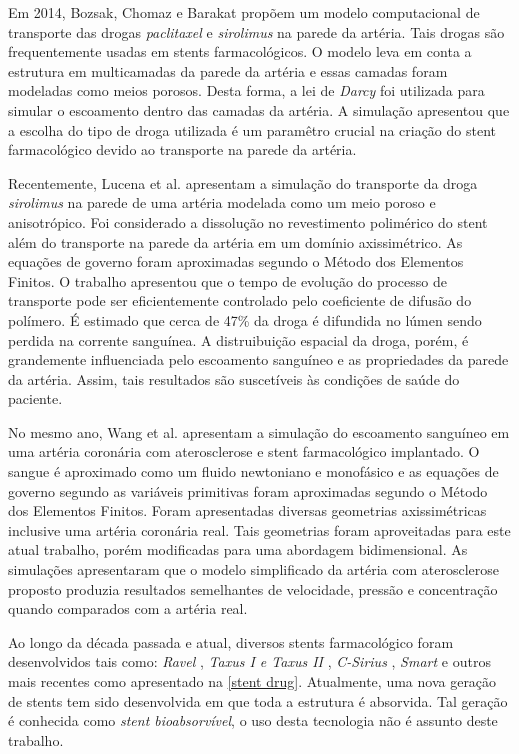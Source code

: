 \medskip
Em 2014, Bozsak, Chomaz e Barakat \cite{bozsak2014} propõem um modelo computacional de transporte
das drogas \textit{paclitaxel} e \textit{sirolimus} na parede da artéria. Tais drogas são 
frequentemente usadas em stents farmacológicos. O modelo leva em conta a estrutura em
multicamadas da parede da artéria e essas camadas foram modeladas como meios porosos.
Desta forma, a lei de \textit{Darcy} foi utilizada para simular o escoamento dentro das camadas
da artéria. A simulação apresentou que a escolha do tipo de droga utilizada
é um paramêtro crucial na criação do stent farmacológico
devido ao transporte na parede da artéria. 

\medskip
Recentemente, Lucena et al. \cite{lucena2017} apresentam
a simulação do transporte da droga \textit{sirolimus} na parede de uma artéria modelada
como um meio poroso e anisotrópico. Foi considerado a dissolução no revestimento polimérico
do stent além do transporte na parede da artéria em um domínio axissimétrico. As equações
de governo foram aproximadas segundo o Método dos Elementos Finitos. O trabalho apresentou
que o tempo de evolução do processo de transporte pode ser eficientemente controlado 
pelo coeficiente de difusão do polímero. É estimado que cerca de 47\% da droga é difundida
no lúmen sendo perdida na corrente sanguínea. A distruibuição espacial da droga, porém, é
grandemente influenciada pelo escoamento sanguíneo e as propriedades da parede da artéria.
Assim, tais resultados são suscetíveis às condições de saúde do paciente.

\medskip
No mesmo ano, Wang et al. \cite{wang2017} apresentam a simulação do escoamento sanguíneo
em uma artéria coronária com aterosclerose e stent farmacológico implantado. O sangue
é aproximado como um fluido newtoniano e monofásico e as equações de governo segundo as 
variáveis primitivas foram aproximadas segundo o Método dos Elementos Finitos. 
Foram apresentadas diversas geometrias axissimétricas inclusive uma artéria coronária real. 
Tais geometrias foram aproveitadas para
este atual trabalho, porém modificadas para uma abordagem bidimensional. As simulações 
apresentaram que o modelo simplificado da artéria com aterosclerose proposto produzia resultados
semelhantes de velocidade, pressão e concentração quando comparados com a artéria real.

\medskip
Ao longo da década passada e atual, diversos stents farmacológico foram desenvolvidos tais como:
\textit{Ravel} \cite{morice2002}, 
\textit{Taxus I e Taxus II} \cite{grube2003} \cite{colombo2003}, 
\textit{C-Sirius} \cite{schampaert2004}, 
\textit{Smart} \cite{ardissino2004} e outros mais recentes como
apresentado na \ref{stent drug}. Atualmente, uma nova geração
de stents tem sido desenvolvida em que toda a estrutura é 
absorvida. Tal geração é conhecida como \textit{stent bioabsorvível},
o uso desta tecnologia não é assunto deste trabalho.

